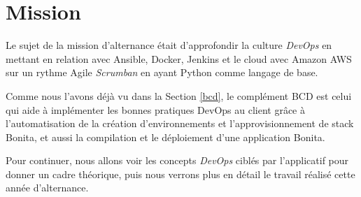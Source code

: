 \section{Mission}
Le sujet de la mission d’alternance était d'approfondir la culture \emph{DevOps} en mettant en relation avec Ansible, Docker, Jenkins et le cloud avec Amazon AWS sur un rythme Agile \textit{Scrumban} en ayant Python comme langage de base.

Comme nous l’avons déjà vu dans la Section \ref{bcd}, le complément BCD est celui qui aide à implémenter les bonnes pratiques DevOps au client grâce à l'automatisation de la création d'environnements et l'approvisionnement de stack Bonita, et aussi la compilation et le déploiement d'une application Bonita.

Pour continuer, nous allons voir les concepts \emph{DevOps} ciblés par l'applicatif pour donner un cadre théorique, puis nous verrons plus en détail le travail réalisé cette année d'alternance.














